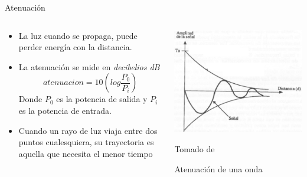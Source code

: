 \documentclass[aspectratio=169]{beamer}
\begin{document}
\begin{frame}{Atenuación}
    \begin{columns}[c, onlytextwidth]
        \begin{column}{0.55\textwidth}
            \begin{itemize}
                \item La luz cuando se propaga, puede perder energía con la distancia.
                \item La atenuación se mide en \textit{decibelios dB}
                \begin{equation*}
                     atenuacion= 10 (log\frac{P_0}{P_i})
                \end{equation*}
                Donde $P_0$ es la potencia de salida y $P_i$ es la potencia de entrada. 
               
                \item Cuando un rayo de luz viaja entre dos puntos cualesquiera, su trayectoria es aquella que necesita el menor tiempo
            \end{itemize}
        \end{column}
        \begin{column}{0.45\textwidth}
            \centering
            \includegraphics[width = 0.9\linewidth]{fig/Optica/atenuacion.png}
            
            \tiny{Tomado de \cite{Fraden_2016}}
            
            \tiny{Atenuación de una onda}
        \end{column}
    \end{columns}
\end{frame}
\end{document}
